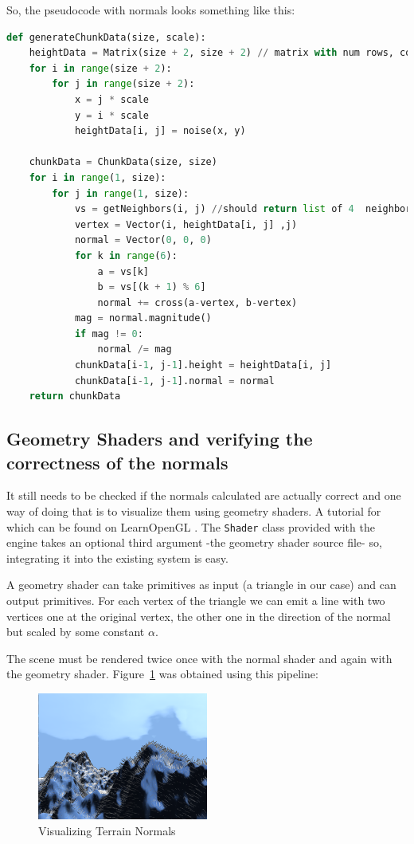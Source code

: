 So, the pseudocode with normals looks something like this:
\begin{lstlisting}[language=Python]
def generateChunkData(size, scale):
	heightData = Matrix(size + 2, size + 2) // matrix with num rows, cols = size + 2
	for i in range(size + 2):
		for j in range(size + 2):
			x = j * scale
			y = i * scale
			heightData[i, j] = noise(x, y)
	
	chunkData = ChunkData(size, size)
	for i in range(1, size):
		for j in range(1, size):
			vs = getNeighbors(i, j) //should return list of 4  neighbors in the correct order
			vertex = Vector(i, heightData[i, j] ,j)
			normal = Vector(0, 0, 0)
			for k in range(6):
				a = vs[k]
				b = vs[(k + 1) % 6]
				normal += cross(a-vertex, b-vertex)
			mag = normal.magnitude()
			if mag != 0:
				normal /= mag
			chunkData[i-1, j-1].height = heightData[i, j]
			chunkData[i-1, j-1].normal = normal			
	return chunkData
\end{lstlisting}

\subsection{Geometry Shaders and verifying the correctness of the normals}

It still needs to be checked if the normals calculated are actually correct and one way of doing that is to visualize them using geometry shaders. A tutorial for which can be found on LearnOpenGL \cite{learnopengl}. The \texttt{Shader} class provided with the engine takes an optional third argument -the geometry shader source file- so, integrating it into the existing system is easy.  

A geometry shader can take primitives as input (a triangle in our case) and can output primitives. For each vertex of the triangle we can emit a line with two vertices one at the original vertex, the other one in the direction of the normal but scaled by some constant $\alpha$.

The scene must be rendered twice once with the normal shader and again with the geometry shader. Figure~\ref{fig:terrain_normals} was obtained using this pipeline:
\begin{figure}[H]
    \centering
    \includegraphics[width=0.5\textwidth]{images/normals.png}
    \caption{Visualizing Terrain Normals}
    \label{fig:terrain_normals}
\end{figure}


